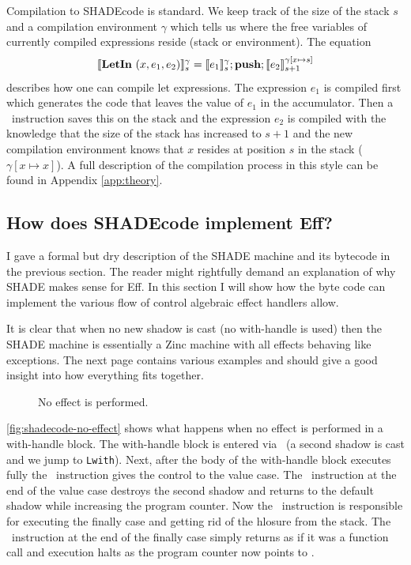\documentclass[class=article, crop=false]{standalone}
\begin{document}
Compilation to SHADEcode is standard. We keep track of the size of the stack
$s$ and a compilation environment $\gamma$ which tells us where the free
variables of currently compiled expressions reside (stack or environment).
The equation
$$ \llbracket \mathbf{LetIn}\ (x, e_1, e_2) \rrbracket_s^\gamma = \llbracket e_1 \rrbracket_s^\gamma; \textbf{push}; \llbracket e_2 \rrbracket_{s+1}^{\gamma[x \mapsto s]} $$
describes how one can compile let expressions. The expression $e_1$ is compiled
first which generates the code that leaves the value of $e_1$ in the accumulator.
Then a \vmPush\ instruction saves this on the stack and the expression $e_2$ is
compiled with the knowledge that the size of the stack has increased to $s+1$
and the new compilation environment knows that $x$ resides at position $s$ in
the stack ($\gamma[x \mapsto x]$). A full description of the compilation process
in this style can be found in Appendix \autoref{app:theory}.

\subsection{How does SHADEcode implement Eff?}
\label{sec:shade-illustration}

I gave a formal but dry description of the SHADE machine and its bytecode in
the previous section. The reader might rightfully demand an explanation of why
SHADE makes sense for Eff. In this section I will show how the byte code can
implement the various flow of control algebraic effect handlers allow.

It is clear that when no new shadow is cast (no with-handle is used) then the
SHADE machine is essentially a Zinc machine with all effects behaving like
exceptions. The next page contains various examples and should give a good
insight into how everything fits together.

\begin{figure}
    \centering
    \caption{No effect is performed.}
    \label{fig:shadecode-no-effect}
\end{figure}

\autoref{fig:shadecode-no-effect} shows what happens when no effect is performed
in a with-handle block. The with-handle block is entered via \vmCastShadow\
(a second shadow is cast and we jump to \lstinline{Lwith}). Next, after the
body of the with-handle block executes fully the \vmKillShadow\ instruction
gives the control to the value case. The \vmRett\ instruction at the end of
the value case destroys the second shadow and returns to the default shadow
while increasing the program counter. Now the \vmFin\ instruction is responsible
for executing the finally case and getting rid of the hlosure from the stack.
The \vmRet\ instruction at the end of the finally case simply returns as if it
was a function call and execution halts as the program counter now points to
\vmHalt.
\end{document}
